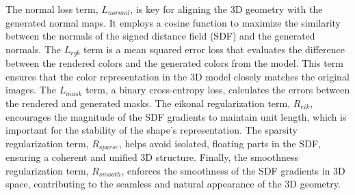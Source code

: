 The normal loss term, \( L_{normal} \), is key for aligning the 3D geometry with the generated normal maps. It employs a cosine function to maximize the similarity between the normals of the signed distance field (SDF) and the generated normals. The \( L_{rgb} \) term is a mean squared error loss that evaluates the difference between the rendered colors and the generated colors from the model. This term ensures that the color representation in the 3D model closely matches the original images. The \( L_{mask} \) term, a binary cross-entropy loss, calculates the errors between the rendered and generated masks. The eikonal regularization term, \( R_{eik} \), encourages the magnitude of the SDF gradients to maintain unit length, which is important for the stability of the shape's representation. The sparsity regularization term, \( R_{sparse} \), helps avoid isolated, floating parts in the SDF, ensuring a coherent and unified 3D structure. Finally, the smoothness regularization term, \( R_{smooth} \), enforces the smoothness of the SDF gradients in 3D space, contributing to the seamless and natural appearance of the 3D geometry.
